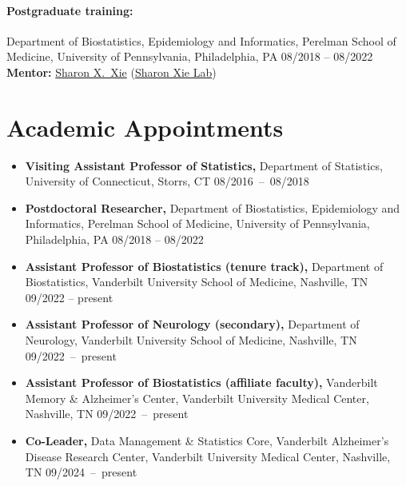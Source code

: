 \documentclass[12pt,letterpaper]{article}
\newenvironment{cventry}{\begin{minipage}[t]{\linewidth}}{\end{minipage}}
\begin{document}
	\paragraph{Postgraduate training:} Department of 
	Biostatistics, Epidemiology and Informatics, Perelman School of Medicine, University of Pennsylvania, Philadelphia, PA \hfill 08/2018 -- 08/2022 \\
	{\bf Mentor:} 
	\href{https://www.med.upenn.edu/apps/faculty/index.php/g275/
		p9964}{Sharon X.\ Xie} 
	(\href{https://sites.google.com/view/sharonxielab/
		home?authuser=0}{Sharon Xie Lab})
	
	\section*{Academic Appointments}
	\begin{itemize}
		\item\begin{cventry} {\bf Visiting Assistant Professor of Statistics,} 
		Department of Statistics, University of Connecticut, Storrs, 
		CT \hfill \mbox{08/2016 -- 08/2018}
		\par\end{cventry}
		\item\begin{cventry} {\bf Postdoctoral Researcher,} Department of 
		Biostatistics, Epidemiology and Informatics, Perelman School of Medicine, University of Pennsylvania, Philadelphia, PA \hfill 08/2018 -- 08/2022
		\par\end{cventry}
		\item\begin{cventry} {\bf Assistant Professor of Biostatistics (tenure 
		track),} Department of Biostatistics, Vanderbilt University 
		School of Medicine, Nashville, TN \hfill 09/2022 -- present
		\par\end{cventry}
		\item\begin{cventry} {\bf Assistant Professor of Neurology (secondary),} 
		Department of Neurology, Vanderbilt University School of 
		Medicine, Nashville, TN \hfill \mbox{09/2022 -- present}
		\par\end{cventry}
		\item\begin{cventry} {\bf Assistant Professor of Biostatistics (affiliate 
		faculty),} Vanderbilt Memory \& Alzheimer's Center, 
		Vanderbilt University Medical Center, Nashville, TN \hfill 
		\mbox{09/2022 -- present}
		\par\end{cventry}
		\item\begin{cventry} {\bf Co-Leader,} Data Management \& Statistics 
		Core, Vanderbilt Alzheimer's Disease Research Center, 
		Vanderbilt University Medical Center, Nashville, TN \hfill 
		\mbox{09/2024 
		-- present}
		\par\end{cventry}
	\end{itemize}
\end{document}
